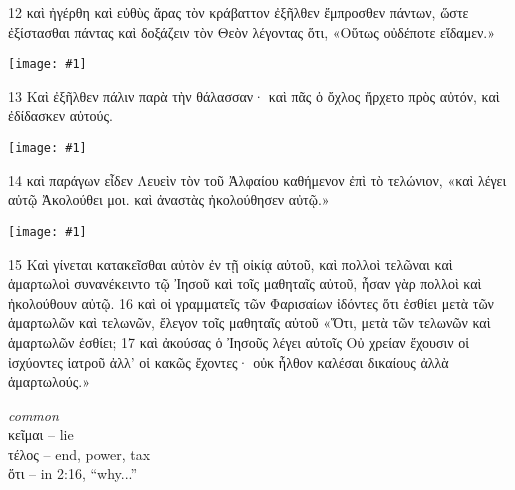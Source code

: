 \documentclass[10pt,a5paper,twoside,twocolumn]{book}
\newcommand{\fig}[1]{\texttt{[image: \#1]}\label{fig:#1}}
\newcommand*\cleartoleftpage{%
  \ifodd\value{page}\hbox{}\clearpage\fi
}
\newenvironment{facing}{\cleartoleftpage}{\clearpage\pagebreak}
\newenvironment{help}{\pagebreak}{}
\newenvironment{helpsec}{\begin{minipage}[t]{\textwidth}\begin{multicols}{2}}{\end{multicols}\end{minipage}}
\newenvironment{vocab}{\begin{helpsec}}{\end{helpsec}}
\begin{document}
\begin{facing}
 12 καὶ ἠγέρθη καὶ εὐθὺς ἄρας τὸν κράβαττον ἐξῆλθεν ἔμπροσθεν πάντων, ὥστε ἐξίστασθαι πάντας καὶ δοξάζειν τὸν Θεὸν λέγοντας ὅτι,
«Οὕτως οὐδέποτε εἴδαμεν.»

\fig{02-13} %

	13 Καὶ ἐξῆλθεν πάλιν παρὰ τὴν θάλασσαν· καὶ πᾶς ὁ ὄχλος ἤρχετο πρὸς αὐτόν, καὶ ἐδίδασκεν αὐτούς. 

\fig{02-14} %

14 καὶ παράγων εἶδεν Λευεὶν τὸν τοῦ Ἀλφαίου καθήμενον ἐπὶ \pagebreak
τὸ τελώνιον, «καὶ λέγει αὐτῷ Ἀκολούθει μοι. καὶ ἀναστὰς ἠκολούθησεν αὐτῷ.»

\fig{02-15} %


15 Καὶ γίνεται κατακεῖσθαι αὐτὸν ἐν τῇ οἰκίᾳ αὐτοῦ, καὶ πολλοὶ τελῶναι καὶ ἁμαρτωλοὶ συνανέκειντο τῷ Ἰησοῦ καὶ τοῖς μαθηταῖς αὐτοῦ, ἦσαν γὰρ πολλοὶ καὶ ἠκολούθουν αὐτῷ. 16 καὶ οἱ γραμματεῖς τῶν Φαρισαίων ἰδόντες ὅτι ἐσθίει μετὰ τῶν ἁμαρτωλῶν καὶ τελωνῶν, ἔλεγον τοῖς μαθηταῖς αὐτοῦ 
«Ὅτι, μετὰ τῶν τελωνῶν καὶ ἁμαρτωλῶν ἐσθίει; 17 καὶ ἀκούσας ὁ Ἰησοῦς λέγει αὐτοῖς Οὐ χρείαν ἔχουσιν οἱ ἰσχύοντες ἰατροῦ ἀλλ’ οἱ κακῶς ἔχοντες· οὐκ ἦλθον καλέσαι δικαίους ἀλλὰ ἁμαρτωλούς.»


\begin{help}
\begin{vocab}
\emph{common}\\
κεῖμαι -- lie\\
τέλος -- end, power, tax\\
ὅτι -- in 2:16, ``why...''\\

\pagebreak


\end{vocab}
\end{help}
\end{facing}
\end{document}
